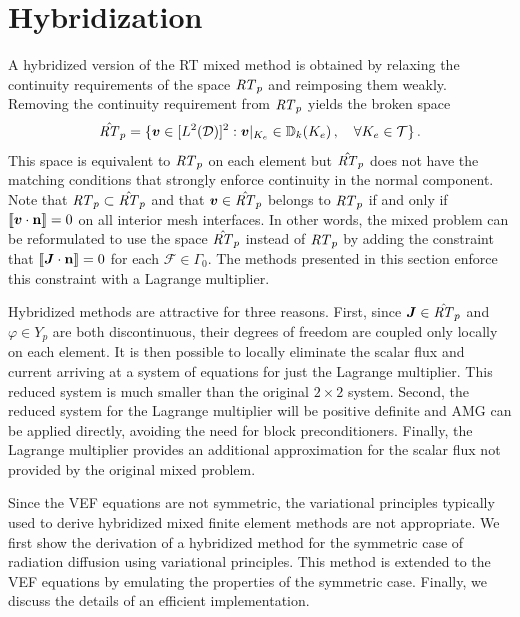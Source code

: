 \documentclass[../doc.tex]{subfiles}
\begin{document}
\section{Hybridization} \label{sec:hyb}
A hybridized version of the RT mixed method is obtained by relaxing the continuity requirements of the space $\mathit{RT}_p$ and reimposing them weakly. Removing the continuity requirement from $\mathit{RT}_p$ yields the broken space 
	\begin{equation}
		\hat{\mathit{RT}}_p = \{ \boldsymbol{v} \in [L^2(\mathcal{D})]^2 : \boldsymbol{v}|_{K_e} \in \mathbb{D}_k(K_e) \,, \quad \forall K_e \in \mathcal{T} \} \,. 
	\end{equation}
This space is equivalent to $\mathit{RT}_p$ on each element but $\hat{\mathit{RT}}_p$ does not have the matching conditions that strongly enforce continuity in the normal component. Note that $\mathit{RT}_p \subset \hat{\mathit{RT}}_p$ and that $\boldsymbol{v} \in \hat{\mathit{RT}}_p$ belongs to $\mathit{RT}_p$ if and only if $\left\llbracket\boldsymbol{v}\cdot\boldsymbol{\mathrm{n}} \right\rrbracket = 0$ on all interior mesh interfaces. In other words, the mixed problem can be reformulated to use the space $\hat{\mathit{RT}}_p$ instead of $\mathit{RT}_p$ by adding the constraint that $\left\llbracket\boldsymbol{J}\cdot\boldsymbol{\mathrm{n}} \right\rrbracket = 0$ for each $\mathcal{F} \in \Gamma_0$. The methods presented in this section enforce this constraint with a Lagrange multiplier. 

Hybridized methods are attractive for three reasons. First, since $\boldsymbol{J}\in\hat{\mathit{RT}}_p$ and $\varphi \in Y_p$ are both discontinuous, their degrees of freedom are coupled only locally on each element. It is then possible to locally eliminate the scalar flux and current arriving at a system of equations for just the Lagrange multiplier. This reduced system is much smaller than the original $2\times 2$ system. Second, the reduced system for the Lagrange multiplier will be positive definite and AMG can be applied directly, avoiding the need for block preconditioners. Finally, the Lagrange multiplier provides an additional approximation for the scalar flux not provided by the original mixed problem. 

Since the VEF equations are not symmetric, the variational principles typically used to derive hybridized mixed finite element methods are not appropriate. We first show the derivation of a hybridized method for the symmetric case of radiation diffusion using variational principles. This method is extended to the VEF equations by emulating the properties of the symmetric case. Finally, we discuss the details of an efficient implementation. 
\end{document}
